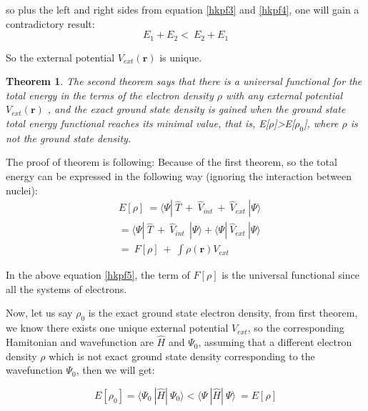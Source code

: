 \documentclass[a4paper, 12pt, titlepage,oneside,drop]{kthesis}
\newtheorem{thm}{Theorem}
\begin{document}
\noindent so plus the left and right sides from equation \ref{hkpf3} and \ref{hkpf4}, one will gain a contradictory result:
\begin{equation}\label{hkpf4}
  E_1 + E_2  < \  E_2 + E_1
\end{equation}

\noindent So the external potential $V_\textit{ext}(\textbf{r})$ is unique.

\begin{thm}
\label{hk2}
\noindent The second theorem says that there is a universal functional for the total energy in the terms of the electron density $\rho$ with any external potential $V_\textit{ext}(\textbf{r})$ ,
and the exact ground state density is gained when the ground state total energy functional reaches its minimal value, that is, E[$\rho$]>E[$\rho_0$], where $\rho$ is not the ground state density.
\end{thm}

\noindent The proof of theorem is following:
Because of the first theorem, so the total energy can be expressed in the following way (ignoring the interaction between nuclei):
\begin{equation}\label{hkpf5}\begin{split}
& E[\rho] \ =\langle \Psi  | \ \hat{T} \ + \ \hat{V}_\textit{int}  \ + \ \hat{V}_\textit{ext} \ | \Psi \rangle \\
&     =\langle \Psi  | \ \hat{T} \ + \ \hat{V}_\textit{int}  \ \ | \Psi \rangle+ \langle \Psi  | \ \hat{V}_\textit{ext} \ | \Psi \rangle \\
&     =\ F[\rho] \ + \ \int \rho(\textbf{r}) V_\textit{ext} 
\end{split}
\end{equation}

\noindent In the above equation \ref{hkpf5}, the term of $F[\rho]$ is the universal functional since all the systems of electrons.

\noindent Now, let us say $\rho_0$ is the exact ground state electron density, from first theorem, we know there exists one unique external potential $V_\textit{ext}$, so 
the corresponding Hamitonian and wavefunction are $\hat{H}$ and $\Psi_0$, assuming that a different electron density $\rho$ which is not exact ground state density 
corresponding to the wavefunction $\Psi_0$, then we will get:

\begin{equation}
E[\rho_0] = \langle \Psi_0\ |\hat{H}|\ \Psi_0 \rangle 
          < \langle \Psi\ |\hat{H}|\ \Psi \rangle \
          = E[\rho]
\end{equation}
\end{document}
